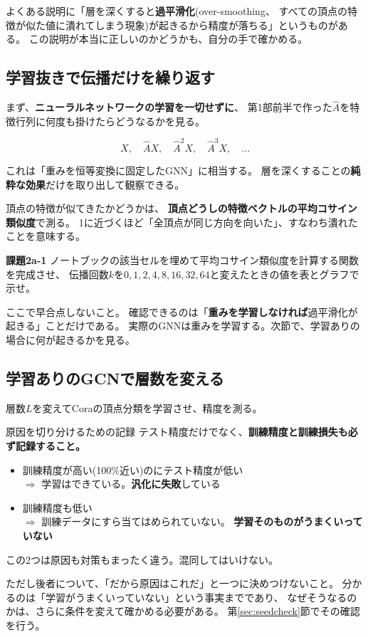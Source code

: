 \documentclass[11pt,a4paper]{jsarticle}
\begin{document}
よくある説明に「層を深くすると\textbf{過平滑化}(over-smoothing、
すべての頂点の特徴が似た値に潰れてしまう現象)が起きるから精度が落ちる」というものがある。
この説明が本当に正しいのかどうかも、自分の手で確かめる。

\subsection{学習抜きで伝播だけを繰り返す}

まず、\textbf{ニューラルネットワークの学習を一切せずに}、
第1部前半で作った$\hat{A}$を特徴行列に何度も掛けたらどうなるかを見る。

\begin{equation}
X,\quad \hat{A}X,\quad \hat{A}^2X,\quad \hat{A}^3X,\quad \dots
\end{equation}

\noindent
これは「重みを恒等変換に固定したGNN」に相当する。
層を深くすることの\textbf{純粋な効果}だけを取り出して観察できる。

頂点の特徴が似てきたかどうかは、
\textbf{頂点どうしの特徴ベクトルの平均コサイン類似度}で測る。
1に近づくほど「全頂点が同じ方向を向いた」、すなわち潰れたことを意味する。

\begin{screen}
\textbf{課題2a-1} \quad ノートブックの該当セルを埋めて平均コサイン類似度を計算する関数を完成させ、
伝播回数$k$を$0,1,2,4,8,16,32,64$と変えたときの値を表とグラフで示せ。
\end{screen}

\noindent
ここで早合点しないこと。
確認できるのは「\textbf{重みを学習しなければ}過平滑化が起きる」ことだけである。
実際のGNNは重みを学習する。次節で、学習ありの場合に何が起きるかを見る。

\subsection{学習ありのGCNで層数を変える}

層数$L$を変えてCoraの頂点分類を学習させ、精度を測る。

\begin{itembox}[l]{原因を切り分けるための記録}
テスト精度だけでなく、\textbf{訓練精度と訓練損失も必ず記録すること。}

\begin{itemize}
\item 訓練精度が高い(100\%近い)のにテスト精度が低い \\
  $\Longrightarrow$ 学習はできている。\textbf{汎化に失敗}している
\item 訓練精度も低い \\
  $\Longrightarrow$ 訓練データにすら当てはめられていない。
  \textbf{学習そのものがうまくいっていない}
\end{itemize}

この2つは原因も対策もまったく違う。混同してはいけない。

ただし後者について、「だから原因はこれだ」と一つに決めつけないこと。
分かるのは「学習がうまくいっていない」という事実までであり、
なぜそうなるのかは、さらに条件を変えて確かめる必要がある。
第\ref{sec:seedcheck}節でその確認を行う。
\end{itembox}
\end{document}
